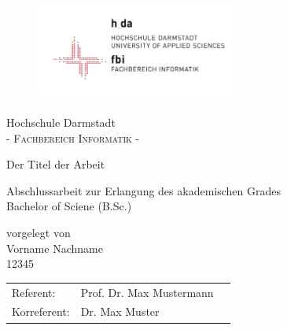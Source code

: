 \pagestyle{empty} %

\begin{figure}[t]
	\centering
	\includegraphics[width=0.6\textwidth]{Abb/logo_fbi}
\end{figure}


\begin{center}
\Large Hochschule Darmstadt \\
\normalsize \textsc{- Fachbereich Informatik -} \\

\vspace{105 pt}

\Huge Der Titel der Arbeit \\ 
\normalsize
\vspace{20 pt}

Abschlussarbeit zur Erlangung des akademischen Grades \\ 
Bachelor of Sciene (B.Sc.) 

\vspace{75 pt}


vorgelegt von \\
\vspace{5 pt}
Vorname Nachname \\
12345
\vspace{115 pt}

\begin{tabular}[h]{p{4cm}l l}
	Referent: & Prof. Dr. Max Mustermann\\
	Korreferent: & Dr. Max Muster
\end{tabular}


\end{center}